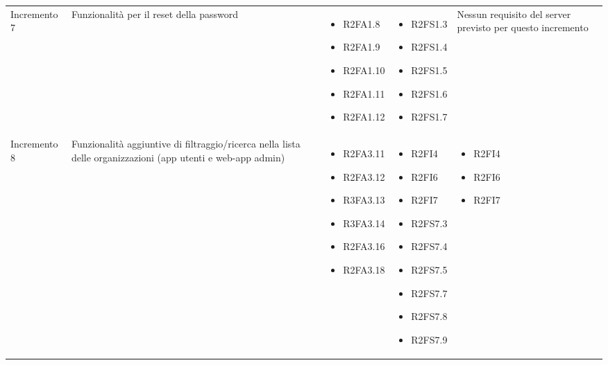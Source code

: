 {\begin{longtable}{C{2.5cm} C{3.2cm} C{2.8cm} C{2.8cm} C{2.8cm}}
Incremento 7 & Funzionalità per il reset della password & \begin{itemize}
    \item[ ] R2FA1.8
    \item[ ] R2FA1.9
    \item[ ] R2FA1.10
    \item[ ] R2FA1.11
    \item[ ] R2FA1.12
\end{itemize} & \begin{itemize} 
    \item[ ] R2FS1.3 %
    \item[ ] R2FS1.4 %
    \item[ ] R2FS1.5 %
    \item[ ] R2FS1.6 %
    \item[ ] R2FS1.7 %
\end{itemize} & 
    Nessun requisito del server previsto per questo incremento \\

Incremento 8 & Funzionalità aggiuntive di filtraggio/ricerca nella lista delle organizzazioni (app utenti e web-app admin) & \begin{itemize}
    \item[ ] R2FA3.11
    \item[ ] R2FA3.12
    \item[ ] R3FA3.13
    \item[ ] R3FA3.14
    \item[ ] R2FA3.16
    \item[ ] R2FA3.18
\end{itemize} & \begin{itemize} 
    \item[ ] R2FI4
    \item[ ] R2FI6
    \item[ ] R2FI7
    \item[ ] R2FS7.3
    \item[ ] R2FS7.4
    \item[ ] R2FS7.5
    \item[ ] R2FS7.7 %
    \item[ ] R2FS7.8 %
    \item[ ] R2FS7.9 %
\end{itemize} & \begin{itemize} 
    \item[ ] R2FI4
    \item[ ] R2FI6
    \item[ ] R2FI7
\end{itemize}\\


\end{longtable}}
